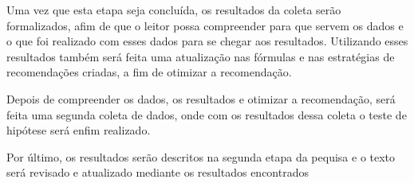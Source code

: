 Uma vez que esta etapa seja concluída, os resultados da coleta serão formalizados, afim de que o leitor
possa compreender para que servem os dados e o que foi realizado com esses
dados para se chegar aos resultados. Utilizando esses resultados também
será feita uma atualização nas fórmulas e nas estratégias de recomendações
criadas, a fim de otimizar a recomendação.

Depois de compreender os dados, os resultados e otimizar a recomendação,
será feita uma segunda coleta de dados, onde com os resultados dessa coleta
o teste de hipótese será enfim realizado.

Por último, os resultados serão descritos na segunda etapa da pequisa e o
texto será revisado e atualizado mediante os resultados encontrados
